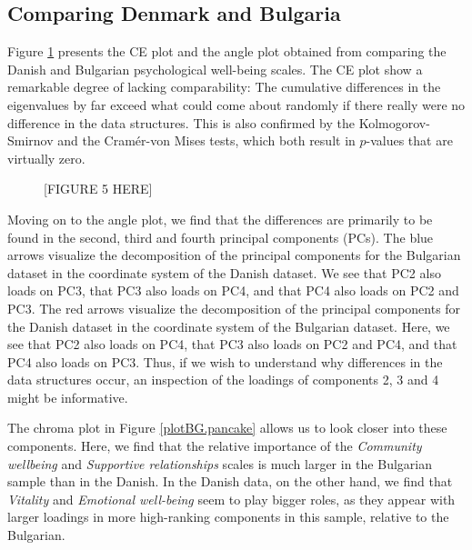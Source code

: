 \documentclass[a4paper,14pt]{article}
\begin{document}
\subsection*{Comparing Denmark and Bulgaria}
Figure \ref{plotBG.cehair} presents the CE plot and the angle plot obtained from comparing the Danish and Bulgarian psychological well-being scales. The CE plot show a remarkable degree of lacking comparability: The cumulative differences in the eigenvalues by far exceed what could come about randomly if there really were no difference in the data structures. This is also confirmed by the Kolmogorov-Smirnov and the Cram\'er-von Mises tests, which both result in $p$-values that are virtually zero.

\begin{figure}[!h]
\caption{[FIGURE 5 HERE]}
\label{plotBG.cehair}
\end{figure}

Moving on to the angle plot, we find that the differences are primarily to be found in the second, third and fourth principal components (PCs). The blue arrows visualize the decomposition of the principal components for the Bulgarian dataset in the coordinate system of the Danish dataset. We see that PC2 also loads on PC3, that PC3 also loads on PC4, and that PC4 also loads on PC2 and PC3. The red arrows visualize the decomposition of the principal components for the Danish dataset in the coordinate system of the Bulgarian dataset. Here, we see that PC2 also loads on PC4, that PC3 also loads on PC2 and PC4, and that PC4 also loads on PC3. Thus, if we wish to understand why differences in the data structures occur, an inspection of the loadings of components 2, 3 and 4 might be informative.

The chroma plot in Figure \ref{plotBG.pancake} allows us to look closer into these components. Here, we find that the relative importance of the \textit{Community wellbeing} and \textit{Supportive relationships} scales is much larger in the Bulgarian sample than in the Danish. In the Danish data, on the other hand, we find that \textit{Vitality} and \textit{Emotional well-being} seem to play bigger roles, as they appear with larger loadings in more high-ranking components in this sample, relative to the Bulgarian.
\end{document}
